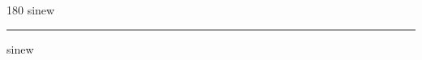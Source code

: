 
\begin{frame}
\begin{center}
\begin{turn}{180}
{\fontsize{2.5cm}{1em}\selectfont sinew}
\end{turn}
\vspace{1em}\par  
\hrule
\vspace{1em}\par  
{\fontsize{2.5cm}{1em}\selectfont sinew}
\end{center}
\end{frame}
